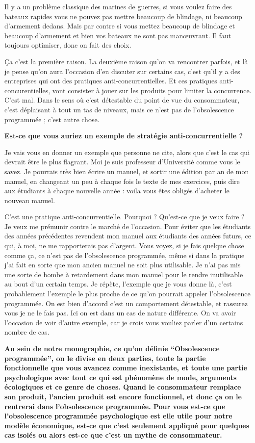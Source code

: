 \begin{small}
Il y a un problème classique des marines de guerres, si vous voulez faire des bateaux rapides vous ne pouvez pas mettre beaucoup de blindage, ni beaucoup d'armement dedans. Mais par contre si vous mettez beaucoup de blindage et beaucoup d'armement et bien vos bateaux ne sont pas manœuvrant. Il faut toujours optimiser, donc on fait des choix. 

Ça c'est la première raison. La deuxième raison qu'on va rencontrer parfois, et là je pense qu'on aura l'occasion d'en discuter sur certains cas, c'est qu'il y a  des entreprises qui ont des pratiques anti-concurrentielles. Et ces pratiques anti-concurentielles, vont consister à jouer sur les produits pour limiter la concurrence. C'est mal. Dans le sens où c'est détestable du point de vue du consommateur, c'est déplaisant à tout un tas de niveaux, mais ce n'est pas de l'obsolescence programmée ; c'est autre chose.

\smallbreak\textbf{Est-ce que vous auriez un exemple de stratégie anti-concurrentielle ?
}\smallbreak

 Je vais vous en donner un exemple que personne ne cite, alors que c'est le cas qui devrait être le plus flagrant. Moi je suis professeur d'Université comme vous le savez. Je pourrais très bien écrire un manuel, et sortir une édition par an de mon manuel, en changeant un peu à chaque fois le texte de mes exercices, puis dire aux étudiants à chaque nouvelle année  : voila vous êtes obligés d'acheter le nouveau manuel. 


C'est une pratique anti-concurrentielle. Pourquoi ? Qu'est-ce que je veux faire ?  Je veux me prémunir contre le marché de l'occasion. Pour éviter que les étudiants des années précédentes revendent mon manuel aux étudiants des années futurs, ce qui, à moi, ne me rapporterais pas d'argent. Vous voyez, si je fais quelque chose comme ça, ce n'est pas de l'obsolescence programmée, même si dans la pratique j'ai fait en sorte que mon ancien manuel ne soit plus utilisable. Je n'ai pas mis une sorte de bombe à retardement dans mon manuel pour le rendre inutilisable au bout d'un certain temps. Je répète, l'exemple que je vous donne là, c'est probablement l'exemple le plus proche de ce qu'on pourrait appeler l'obsolescence programmée. On est bien d'accord c'est un comportement détestable, et rassurez vous je ne le fais pas. Ici on est dans un cas de nature différente. On va avoir l'occasion de voir d'autre exemple, car je crois vous vouliez parler d'un certains nombre de cas.

\smallbreak\textbf{
Au sein de notre monographie, ce qu'on définie “Obsolescence programmée”, on le divise en deux parties, toute la partie fonctionnelle que vous avancez comme inexistante, et toute une partie psychologique avec tout ce qui est phénomène de mode, arguments écologiques et ce genre de choses. Quand le consommateur remplace son produit, l'ancien produit est encore fonctionnel, et donc ça on le rentrerai dans l'obsolescence programmée. Pour vous est-ce que l'obsolescence programmée psychologique est elle utile pour notre modèle économique, est-ce que c'est seulement appliqué pour quelques cas isolés ou alors est-ce que c'est un mythe de consommateur.
}\smallbreak


\end{small}
